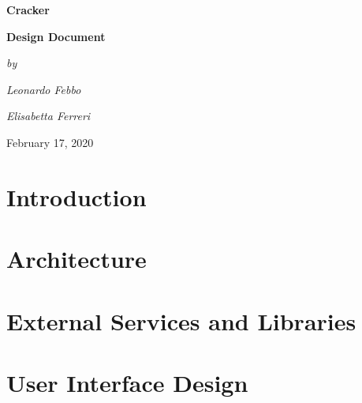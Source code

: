 \begin{titlepage}
\begin{center}
{\textbf{\Huge{Cracker}}}
\vspace{10mm}

{\textbf{\Large{Design Document}}}
\vspace{25mm}

{\slshape{\Large{by}}} 
\vspace{3mm}

{\slshape{\Large{Leonardo Febbo}}} 
\vspace{3mm}

{\slshape{\Large{Elisabetta Ferreri}}}

\vfill
{\large{February 17, 2020}}

\end{center}

\end{titlepage}

\setcounter{page}{2}


\newpage
{
	\hypersetup{linkcolor=black}
	\tableofcontents
}
\clearpage
{\section{Introduction}}
\label{sect:introduction}


\clearpage
{\section{Architecture}}
\label{sect:architecture}


\clearpage
{\section{External Services and Libraries}}
\label{sect:extservices}


\clearpage
{\section{User Interface Design}}
\label{sect:ui}


